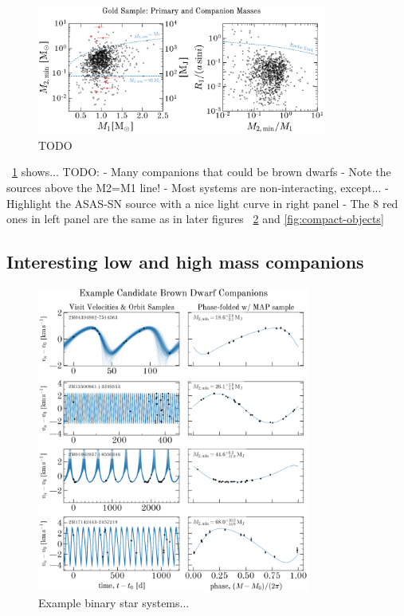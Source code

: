 \documentclass[modern]{aastex63}
\begin{document}
\begin{figure}[t]
    \begin{center}
    \includegraphics[width=0.85\textwidth]{m2_m1_roche.pdf}
    \end{center}
    \caption{%
    TODO
    \label{fig:m2m1}
    }
\end{figure}

\figurename~\ref{fig:m2m1} shows...
TODO:
- Many companions that could be brown dwarfs
- Note the sources above the M2=M1 line!
- Most systems are non-interacting, except...
- Highlight the ASAS-SN source with a nice light curve in right panel
- The 8 red ones in left panel are the same as in later figures \figurename~\ref{fig:brown-dwarfs} and \ref{fig:compact-objects}



\subsection{Interesting low and high mass companions}
\label{sec:low-high-mass}

\begin{figure}[!t]
    \begin{center}
    \includegraphics[width=0.8\textwidth]{example-brown-dwarfs-placeholder.png}
    \end{center}
    \caption{%
    Example binary star systems...
    \label{fig:brown-dwarfs}
    }
\end{figure}
\end{document}
